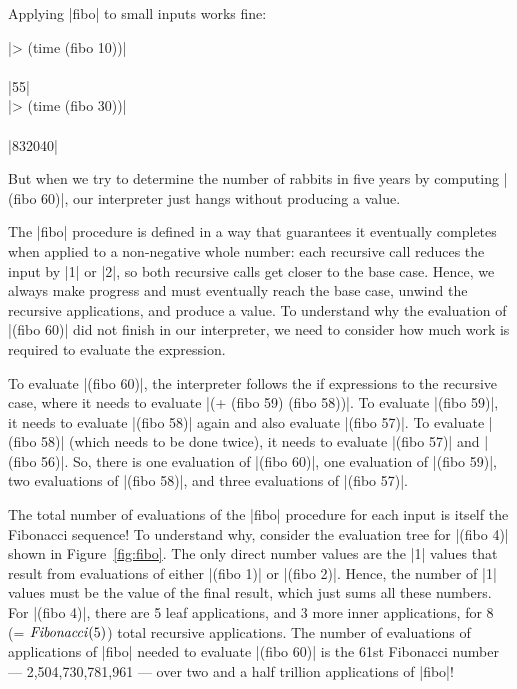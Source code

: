 \begin{schemeregion}
{Applying \scheme|fibo| to small inputs works fine:

\begin{code}
\scheme|> (time (fibo 10))|\\
\\
\schemeresult|55|\\
\scheme|> (time (fibo 30))|\\
\\
\schemeresult|832040|
\end{code}

But when we try to determine the number of rabbits in five years by computing \scheme|(fibo 60)|, our interpreter just hangs without producing a value.%

The \scheme|fibo| procedure is defined in a way that guarantees it eventually completes when applied to a non-negative whole number: each recursive call reduces the input by \scheme|1| or \scheme|2|, so both recursive calls get closer to the base case.  Hence, we always make progress and must eventually reach the base case, unwind the recursive applications, and produce a value.  To understand why the evaluation of \scheme|(fibo 60)| did not finish in our interpreter, we need to consider how much work is required to evaluate the expression.  

To evaluate \scheme|(fibo 60)|, the interpreter follows the if expressions to the recursive case, where it needs to evaluate \scheme|(+ (fibo 59) (fibo 58))|.  To evaluate \scheme|(fibo 59)|, it needs to evaluate \scheme|(fibo 58)| again and also evaluate \scheme|(fibo 57)|.  To evaluate \scheme|(fibo 58)| (which needs to be done twice), it needs to evaluate \scheme|(fibo 57)| and \scheme|(fibo 56)|.  So, there is one evaluation of \scheme|(fibo 60)|, one evaluation of \scheme|(fibo 59)|, two evaluations of \scheme|(fibo 58)|, and three evaluations of \scheme|(fibo 57)|.  

The total number of evaluations of the \scheme|fibo| procedure for each input is itself the Fibonacci sequence!  To understand why, consider the evaluation tree for \scheme|(fibo 4)| shown in Figure~\ref{fig:fibo}.  The only direct number values are the \schemeresult|1| values that result from evaluations of either \scheme|(fibo 1)| or \scheme|(fibo 2)|.  Hence, the number of \schemeresult|1| values must be the value of the final result, which just sums all these numbers.   For \scheme|(fibo 4)|, there are 5 leaf applications, and 3 more inner applications, for 8 (= $\textrm{\emph{Fibonacci}}(5)$) total recursive applications.  The number of evaluations of applications of \scheme|fibo| needed to evaluate \scheme|(fibo 60)| is the 61st Fibonacci number --- 2,504,730,781,961 --- over two and a half trillion applications of \scheme|fibo|!  

}
\end{schemeregion}
